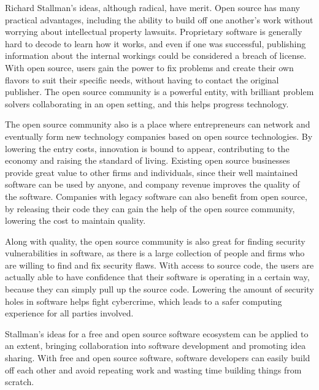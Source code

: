 ﻿Richard Stallman's ideas, although radical, have merit.
Open source has many practical advantages, including the ability to build off one another's work without worrying about intellectual property lawsuits.
Proprietary software is generally hard to decode to learn how it works, and even if one was successful, publishing information about the internal workings could be considered a breach of license.
With open source, users gain the power to fix problems and create their own flavors to suit their specific needs, without having to contact the original publisher.
The open source community is a powerful entity, with brilliant problem solvers collaborating in an open setting, and this helps progress technology.

The open source community also is a place where entrepreneurs can network and eventually form new technology companies based on open source technologies.
By lowering the entry costs, innovation is bound to appear, contributing to the economy and raising the standard of living.
Existing open source businesses provide great value to other firms and individuals, since their well maintained software can be used by anyone, and company revenue improves the quality of the software.
Companies with legacy software can also benefit from open source, by releasing their code they can gain the help of the open source community, lowering the cost to maintain quality.

Along with quality, the open source community is also great for finding security vulnerabilities in software, as there is a large collection of people and firms who are willing to find and fix security flaws.
With access to source code, the users are actually able to have confidence that their software is operating in a certain way, because they can simply pull up the source code.
Lowering the amount of security holes in software helps fight cybercrime, which leads to a safer computing experience for all parties involved.

Stallman's ideas for a free and open source software ecosystem can be applied to an extent, bringing collaboration into software development and promoting idea sharing.
With free and open source software, software developers can easily build off each other and avoid repeating work and wasting time building things from scratch.
